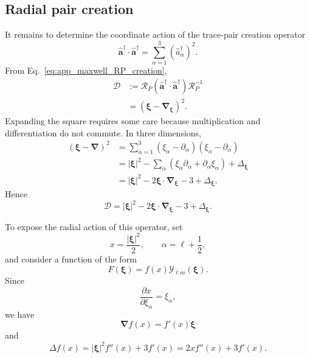\documentclass[11pt,oneside]{article}
\numberwithin{equation}{section}
\theoremstyle{definition}
\begin{document}
\subsection{Radial pair creation}

It remains to determine the coordinate action of the trace-pair creation
operator
\begin{equation}
\hat{\bm a}^\dagger\cdot\hat{\bm a}^\dagger
=
\sum_{\alpha=1}^{3}
(\hat a_\alpha^\dagger)^2.
\end{equation}
From Eq.~\eqref{eq:app_maxwell_RP_creation},
\begin{align}
\mathcal D
&:=
\mathcal R_P
\left(
\hat{\bm a}^\dagger\cdot\hat{\bm a}^\dagger
\right)
\mathcal R_P^{-1}
\nonumber\\
&=
(\bm\xi-\bm\nabla_{\bm\xi})^2.
\end{align}
Expanding the square requires some care because multiplication and
differentiation do not commute.  In three dimensions,
\begin{align}
(\bm\xi-\bm\nabla)^2
&=
\sum_{\alpha=1}^{3}
(\xi_\alpha-\partial_\alpha)
(\xi_\alpha-\partial_\alpha)
\nonumber\\
&=
|\bm\xi|^2
-
\sum_{\alpha}
\left(
\xi_\alpha\partial_\alpha
+
\partial_\alpha\xi_\alpha
\right)
+
\Delta_{\bm\xi}
\nonumber\\
&=
|\bm\xi|^2
-
2\bm\xi\cdot\bm\nabla_{\bm\xi}
-
3
+
\Delta_{\bm\xi}.
\end{align}
Hence
\begin{equation}
\mathcal D
=
|\bm\xi|^2
-
2\bm\xi\cdot\bm\nabla_{\bm\xi}
-
3
+
\Delta_{\bm\xi}.
\label{eq:app_maxwell_radial_pair_operator}
\end{equation}

To expose the radial action of this operator, set
\begin{equation}
x=\frac{|\bm\xi|^2}{2},
\qquad
\alpha=\ell+\frac12,
\label{eq:app_maxwell_radial_x_alpha}
\end{equation}
and consider a function of the form
\begin{equation}
F(\bm\xi)
=
f(x)\mathcal Y_{\ell m}(\bm\xi).
\label{eq:app_maxwell_radial_ansatz}
\end{equation}
Since
\begin{equation}
\frac{\partial x}{\partial\xi_\alpha}
=
\xi_\alpha,
\end{equation}
we have
\begin{equation}
\bm\nabla f(x)
=
f'(x)\bm\xi
\end{equation}
and
\begin{equation}
\Delta f(x)
=
|\bm\xi|^2f''(x)+3f'(x)
=
2x f''(x)+3f'(x).
\label{eq:app_maxwell_radial_scalar_laplacian}
\end{equation}
\end{document}
